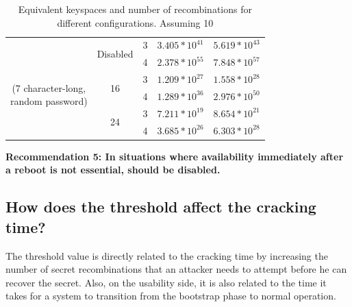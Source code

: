 \begin{table}[t]
\begin{tabular}{ | c | c | c | c | c |}
        \hline
        \multirow{6}{*}{\parbox[h]{1.8cm}{\\(7 character-long,\\ random password)}} 
        & \multirow{2}{*}{Disabled} & 3 & $3.405*10^{41}$ & $5.619*10^{43}$ \\ 
                                \cline{3-5}
                                &    & 4 & $2.378*10^{55}$ & $7.848*10^{57}$ \\
                                \cline{2-5}
                                & \multirow{2}{*}{16} & 3 & $1.209*10^{27}$ & $1.558*10^{28}$ \\ 
                                \cline{3-5}
                                &    & 4 & $1.289*10^{36}$ & $2.976*10^{50}$ \\ 
                                \cline{2-5}
                                & \multirow{2}{*}{24} & 3 & $7.211*10^{19}$ & $8.654*10^{21}$\\ 
                                \cline{3-5}
                               &    & 4 & $3.685*10^{26}$ & $6.303*10^{28}$ \\ 
                                \cline{2-5}

        \hline

    \end{tabular}
    \caption{{\small Equivalent keyspaces and number of recombinations for
    different \PPH configurations. Assuming 10 \thresholdaccounts}}
    \label{TABLE:pph-configurations}
\end{table}



{\bf Recommendation 5: In situations where availability immediately
after a reboot is not essential, \partialverification should be disabled.}

\subsection{How does the threshold affect the cracking time?}
\label{SUBSEC:threshold-value}


The threshold value is directly related to the cracking time by
increasing the number of secret recombinations that an attacker needs
to attempt before he can recover the secret. Also, on the usability side,
it is also related to the time it takes for a system to transition
from the bootstrap phase to normal operation.  

